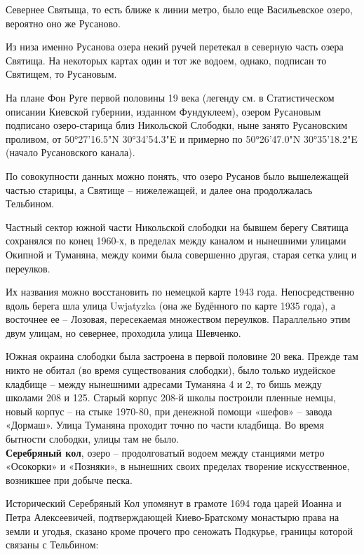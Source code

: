 Севернее Святыща, то есть ближе к линии метро, было еще Васильевское озеро, вероятно оно же Русаново.

Из низа именно Русанова озера некий ручей перетекал в северную часть озера Святища. На некоторых картах один и тот же водоем, однако, подписан то Святищем, то Русановым.

На плане Фон Руге первой половины 19 века (легенду см. в Статистическом описании Киевской губернии, изданном Фундуклеем), озером Русановым подписано озеро-старица близ Никольской Слободки, ныне занято Русановским проливом, от 50°27'16.5"N 30°34'54.3"E и примерно по 50°26'47.0"N 30°35'18.2"E (начало Русановского канала). 

По совокупности данных можно понять, что озеро Русанов было вышележащей частью старицы, а Святище – нижележащей, и далее она продолжалась Тельбином.

Частный сектор южной части Никольской слободки на бывшем берегу Святища сохранялся по конец 1960-х, в пределах между каналом и нынешними улицами Окипной и Туманяна, между коими была совершенно другая, старая сетка улиц и переулков.

Их названия можно восстановить по немецкой карте 1943 года. Непосредственно вдоль берега шла улица Uwjatyzka (она же Будённого по карте 1935 года), а восточнее ее – Лозовая, пересекаемая множеством переулков. Параллельно этим двум улицам, но севернее, проходила улица Шевченко.

Южная окраина слободки была застроена в первой половине 20 века. Прежде там никто не обитал (во время существования слободки), было только иудейское кладбище – между нынешними адресами Туманяна 4 и 2, то бишь между школами 208 и 125. Старый корпус 208-й школы построили пленные немцы, новый корпус – на стыке 1970-80, при денежной помощи «шефов» – завода «Дормаш». Улица Туманяна проходит точно по части кладбища. Во время бытности слободки, улицы там не было.\\


\textbf{Серебряный кол}, озеро – продолговатый водоем между станциями метро «Осокорки» и «Позняки», в нынешних своих пределах творение искусственное, возникшее при добыче песка.

Исторический Серебряный Кол упомянут в грамоте 1694 года царей Иоанна и Петра Алексеевичей, подтверждающей Киево-Братскому монастырю права на земли и угодья, сказано кроме прочего про сеножать Подкурье, границы которой связаны с Тельбином:


